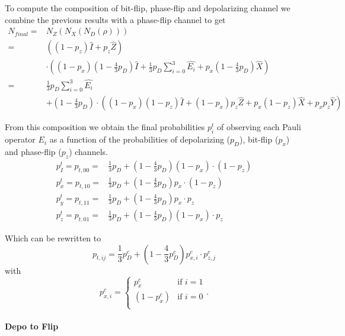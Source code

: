 To compute the composition of bit-flip, phase-flip and depolarizing channel 
we combine the previous results with a phase-flip channel to get 
\begin{align*}
    N_{final} =&N_Z(N_X(N_D(\rho))) \\
    =& \left((1-p_z)\hat{I} + p_z \hat{Z}\right) \\
    & \cdot \left((1-p_x)\left(1-\frac{4}{3}p_D\right) \hat{I} + \frac{1}{3} p_D \sum_{i=0}^{3}\hat{E_i}  + p_x\left(1-\frac{4}{3}p_D\right) \hat{X}\right) \\
    =& \frac{1}{3} p_D \sum_{i=0}^{3} \hat{E_i} \\
    &+ \left(1-\frac{4}{3}p_D \right)\cdot\left((1-p_x)(1-p_z) \hat{I}+ (1-p_x) p_z \hat{Z} + p_x (1-p_z) \hat{X} + p_x p_z \hat{Y}\right)
\end{align*}

From this composition we obtain the final probabilities $p_{i}^t$ of observing each Pauli operator $E_i$ 
as a function of the probabilities of depolarizing ($p_D$), bit-flip ($p_x$) and phase-flip ($p_z$) channels.
\begin{align}
    p_I^t = p_{t,00} =& \frac{1}{3} p_D + \left( 1-\frac{4}{3}p_D\right) (1-p_x)\cdot(1-p_z) \label{eq:total_comp_I}\\
    p_x^t = p_{t,10} =& \frac{1}{3} p_D + \left( 1-\frac{4}{3}p_D\right) p_x \cdot(1-p_z) \label{eq:total_comp_X}\\
    p_y^t = p_{t,11} =& \frac{1}{3} p_D + \left( 1-\frac{4}{3}p_D\right) p_x\cdot p_z\label{eq:total_comp_Y}\\
    p_z^t = p_{t,01} =& \frac{1}{3} p_D + \left( 1-\frac{4}{3}p_D\right) (1-p_x)\cdot p_z\label{eq:total_comp_Z} 
\end{align}

Which can be rewritten to 
\begin{equation}
    p_{t,ij} = \frac{1}{3} p_D^c + \left( 1- \frac{4}{3} p_D^c \right) p_{x,i}^c \cdot p_{z,j}^c 
    \label{eq_total_comp_short}
\end{equation}
with 
\begin{equation*}
    p_{x,i}^c = 
    \begin{cases}
        p_x^c & \text{if } i=1  \\
        (1-p_x^c) & \text{if } i=0\\
    \end{cases}.
\end{equation*}



\paragraph*{Depo to Flip}\label{para:depo_to_flip}

